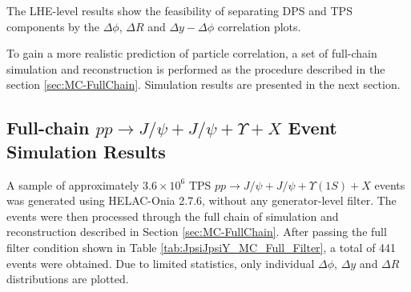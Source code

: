 \documentclass[10pt,twocolumn]{article}
\begin{document}
The LHE-level results show the feasibility of separating DPS and TPS components by the $\Delta \phi$, $\Delta R$ and $\Delta y - \Delta \phi$ correlation plots.

To gain a more realistic prediction of particle correlation, a set of full-chain simulation and reconstruction is performed as the procedure described in the section \ref{sec:MC-FullChain}. Simulation results are presented in the next section.

\subsection{Full-chain $pp\to J/\psi+J/\psi+\Upsilon+X$ Event Simulation Results}

A sample of approximately $3.6\times 10^6$ TPS $pp\to J/\psi+J/\psi+\Upsilon(1S)+X$ events was generated using HELAC-Onia 2.7.6, without any generator-level filter. The events were then processed through the full chain of simulation and reconstruction described in Section \ref{sec:MC-FullChain}. After passing the full filter condition shown in Table \ref{tab:JpsiJpsiY_MC_Full_Filter}, a total of 441 events were obtained. Due to limited statistics, only individual $\Delta \phi$, $\Delta y$ and $\Delta R$ distributions are plotted. 
\end{document}
